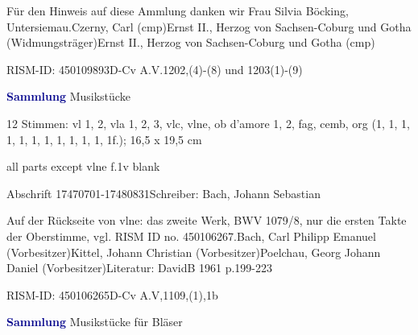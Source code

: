 \documentclass[a4paper, twocolumn, 11pt]{book}
\begin{document}
\par Für den Hinweis auf diese Ammlung danken wir Frau Silvia Böcking, Untersiemau.\newline Czerny, Carl  (cmp)\newline Ernst II., Herzog von Sachsen-Coburg und Gotha  (Widmungsträger)\newline Ernst II., Herzog von Sachsen-Coburg und Gotha  (cmp)
\par RISM-ID: 450109893\newline D-Cv  A.V.1202,(4)-(8) und 1203(1)-(9)
\par \vspace{16pt} \textcolor{darkblue}{\textbf{Sammlung}}\hfillplus{[79]} Musikstücke
\par \begin{itshape}\end{itshape} 
\par \textcolor{darkblue}{}  12 Stimmen: vl 1, 2, vla 1, 2, 3, vlc, vlne, ob d'amore 1, 2, fag, cemb, org  (1, 1, 1, 1, 1, 1, 1, 1, 1, 1, 1, 1f.); 16,5 x 19,5 cm\newline \begin{small} all parts except vlne f.1v blank\end{small} \newline Abschrift  17470701-17480831\newline Schreiber: Bach, Johann Sebastian
\par Auf der Rückseite von vlne: das zweite Werk, BWV 1079/8, nur die ersten Takte der Oberstimme, vgl. RISM ID no. 450106267.\newline Bach, Carl Philipp Emanuel  (Vorbesitzer)\newline Kittel, Johann Christian  (Vorbesitzer)\newline Poelchau, Georg Johann Daniel  (Vorbesitzer)\newline Literatur: DavidB 1961  p.199-223
\par RISM-ID: 450106265\newline D-Cv  A.V,1109,(1),1b
\par \vspace{16pt} \textcolor{darkblue}{\textbf{Sammlung}}\hfillplus{[80]} Musikstücke für Bläser
\end{document}
